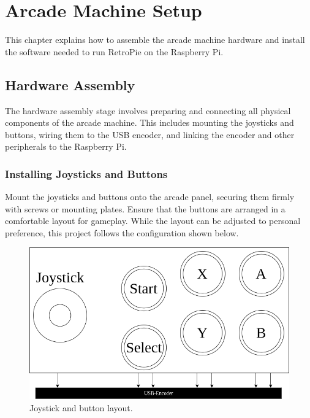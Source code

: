 \chapter{Arcade Machine Setup}
\label{cha:arcade_machine_setup}

This chapter explains how to assemble the arcade machine hardware and install the software needed to run RetroPie on the Raspberry Pi.  

\section{Hardware Assembly}
\label{sec:hardware_assembly}

The hardware assembly stage involves preparing and connecting all physical components of the arcade machine. This includes mounting the joysticks and buttons, wiring them to the USB encoder, and linking the encoder and other peripherals to the Raspberry Pi.


\subsection{Installing Joysticks and Buttons}
\label{subsec:installing_joysticks_buttons}
Mount the joysticks and buttons onto the arcade panel, securing them firmly with screws or mounting plates. Ensure that the buttons are arranged in a comfortable layout for gameplay. While the layout can be adjusted to personal preference, this project follows the configuration shown below.
\\
\begin{figure}[htb] 
	\centering  
	\includegraphics[scale=0.35]{F_Figures/button_layout.png}
	\caption{Joystick and button layout.}
	\label{fig:button_layout}
\end{figure} 

